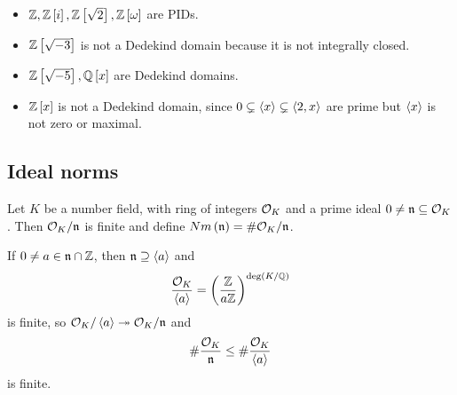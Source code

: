 \begin{example*}
\hfill
\begin{itemize}
\item $ \Z, \Z\sb{i}, \Z\sb{\sqrt{2}}, \Z\sb{\omega} $ are PIDs.
\item $ \Z\sb{\sqrt{-3}} $ is not a Dedekind domain because it is not integrally closed.
\item $ \Z\sb{\sqrt{-5}}, \Q\sb{x} $ are Dedekind domains.
\item $ \Z\sb{x} $ is not a Dedekind domain, since $ 0 \subsetneq \ab{x} \subsetneq \ab{2, x} $ are prime but $ \ab{x} $ is not zero or maximal.
\end{itemize}
\end{example*}

\subsection{Ideal norms}

\begin{definition}
Let $ K $ be a number field, with ring of integers $ \OO_K $ and a prime ideal $ 0 \ne \nn \subseteq \OO_K $. Then $ \OO_K / \nn $ is finite and define $ Nm\rb{\nn} = \#\OO_K / \nn $.
\end{definition}

If $ 0 \ne a \in \nn \cap \Z $, then $ \nn \supseteq \ab{a} $ and
$$ \dfrac{\OO_K}{\ab{a}} = \rb{\dfrac{\Z}{a\Z}}^{\deg\rb{K / \Q}} $$
is finite, so $ \OO_K / \ab{a} \twoheadrightarrow \OO_K / \nn $ and
$$ \#\dfrac{\OO_K}{\nn} \le \#\dfrac{\OO_K}{\ab{a}} $$
is finite.

\pagebreak

